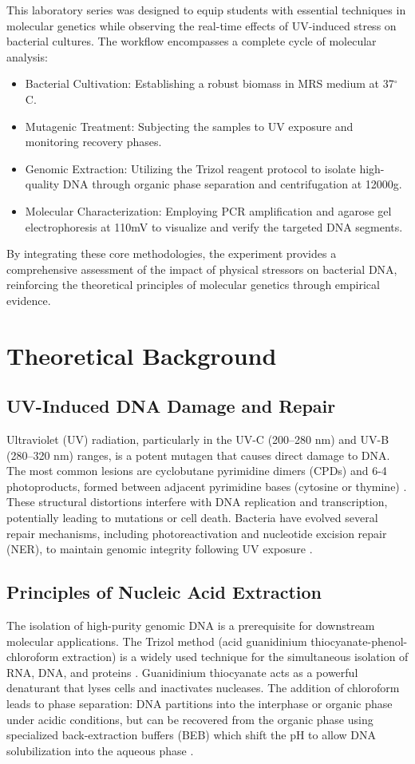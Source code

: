 \documentclass[a4paper]{article}
\begin{document}
This laboratory series was designed to equip students with essential techniques in molecular genetics while observing the real-time effects of UV-induced stress on bacterial cultures. The workflow encompasses a complete cycle of molecular analysis:
\begin{itemize}
    \item Bacterial Cultivation: Establishing a robust biomass in MRS medium at 37$^\circ$C.
    \item Mutagenic Treatment: Subjecting the samples to UV exposure and monitoring recovery phases.
    \item Genomic Extraction: Utilizing the Trizol reagent protocol to isolate high-quality DNA through organic phase separation and centrifugation at 12000g.
    \item Molecular Characterization: Employing PCR amplification and agarose gel electrophoresis at 110mV to visualize and verify the targeted DNA segments.
\end{itemize}
By integrating these core methodologies, the experiment provides a comprehensive assessment of the impact of physical stressors on bacterial DNA, reinforcing the theoretical principles of molecular genetics through empirical evidence.

\section{Theoretical Background}

\subsection{UV-Induced DNA Damage and Repair}
Ultraviolet (UV) radiation, particularly in the UV-C (200--280 nm) and UV-B (280--320 nm) ranges, is a potent mutagen that causes direct damage to DNA. The most common lesions are cyclobutane pyrimidine dimers (CPDs) and 6-4 photoproducts, formed between adjacent pyrimidine bases (cytosine or thymine) \cite{1}. These structural distortions interfere with DNA replication and transcription, potentially leading to mutations or cell death. Bacteria have evolved several repair mechanisms, including photoreactivation and nucleotide excision repair (NER), to maintain genomic integrity following UV exposure \cite{1}.

\subsection{Principles of Nucleic Acid Extraction}
The isolation of high-purity genomic DNA is a prerequisite for downstream molecular applications. The Trizol method (acid guanidinium thiocyanate-phenol-chloroform extraction) is a widely used technique for the simultaneous isolation of RNA, DNA, and proteins \cite{2}. Guanidinium thiocyanate acts as a powerful denaturant that lyses cells and inactivates nucleases. The addition of chloroform leads to phase separation: DNA partitions into the interphase or organic phase under acidic conditions, but can be recovered from the organic phase using specialized back-extraction buffers (BEB) which shift the pH to allow DNA solubilization into the aqueous phase \cite{2}.
\end{document}
